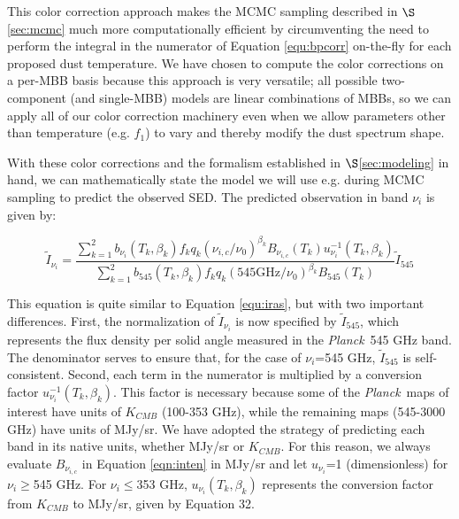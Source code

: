 \documentclass{emulateapj}
\newcommand{\IRAS}{{\it IRAS}}
\newcommand{\PLANCK}{{\it Planck}}
\begin{document}

This color correction approach makes the MCMC sampling described in 
$\S$\ref{sec:mcmc} much more computationally efficient by circumventing the 
need to perform the integral in the numerator of Equation \ref{equ:bpcorr} 
on-the-fly for each proposed dust temperature. We have chosen to compute the 
color corrections on a per-MBB basis because this approach is very 
versatile; all possible two-component (and single-MBB) models are linear 
combinations of MBBs, so we can apply all of our color correction machinery 
even when we allow parameters other than temperature (e.g. $f_1$) to vary and 
thereby modify the dust spectrum shape.


With these color corrections and the  formalism established in 
$\S$\ref{sec:modeling} in hand, we can mathematically state the model we will 
use e.g. during MCMC sampling to predict the observed SED. The predicted 
observation in band $\nu_i$ is given by:

\begin{equation}
\label{eqn:inten}
\tilde{I}_{\nu_i} = \frac{\sum\limits_{k=1}^{2} b_{\nu_i}(T_k, \beta_k) f_k q_k (\nu_{i,c}/\nu_0)^{\beta_k} B_{\nu_{i,c}}(T_k) u_{\nu_i}^{-1}(T_k, \beta_k)}{\sum\limits_{k=1}^{2} b_{545}(T_k, \beta_k) f_k q_k (545 \textrm{GHz}/\nu_0)^{\beta_k} B_{545}(T_k)}\tilde{I}_{545}
\end{equation}

This equation is quite similar to Equation \ref{equ:iras}, but with two 
important differences. First, the normalization of $\tilde{I}_{\nu_i}$ is now 
specified by $\tilde{I}_{545}$, which represents the flux density per solid
angle measured in the \PLANCK~545 GHz band. The denominator serves to ensure 
that, for the case of $\nu_i$=545 GHz, $\tilde{I}_{545}$ is self-consistent. 
Second, each term in the numerator is multiplied by a conversion factor 
$u_{\nu_i}^{-1}(T_k, \beta_k)$. This factor is necessary because some of the 
\PLANCK~maps of interest have units of $K_{CMB}$ (100-353 GHz), while the
remaining maps (545-3000 GHz) have units of MJy/sr. We have adopted the 
strategy of predicting each band in its native units, whether MJy/sr or 
$K_{CMB}$. For this reason, we always evaluate $B_{\nu_{i,c}}$ in Equation 
\ref{eqn:inten} in MJy/sr and let $u_{\nu_i}$=1 (dimensionless) for 
$\nu_i$$\ge$545 GHz. For $\nu_i$$\le$353 GHz, $u_{\nu_i}(T_k, \beta_k)$ 
represents the conversion factor from $K_{CMB}$ to MJy/sr, given by 
\cite{planckresponse} Equation 32.
\end{document}

